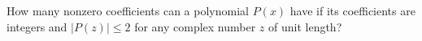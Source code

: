 How many nonzero coefficients can a polynomial $ P(x)$ have if its coefficients are integers and $ |P(z)| \le 2$ for any complex number $ z$ of unit length?